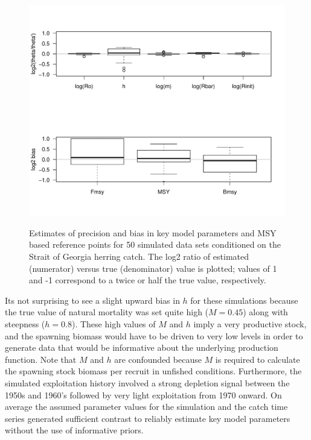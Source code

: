 \begin{figure}[!tbp]
	\includegraphics[width=\textwidth]{../Figs/SOGParameterBias.pdf}\\
	\caption{Estimates of precision and bias in key model parameters and MSY based reference points for 50 simulated data sets conditioned on the Strait of Georgia herring catch. The log2 ratio of estimated (numerator) versus true (denominator) value is plotted; values of 1 and -1 correspond to a twice or  half the true value, respectively.}\label{FigSogBias}
\end{figure}

Its not surprising to see a slight upward bias in $h$ for these simulations because the true value of natural mortality was set quite high ($M=0.45$) along with steepness ($h=0.8$). These high values of $M$ and $h$ imply a very productive stock, and the spawning biomass would have to be driven to very low levels in order to generate data that would be informative about the underlying production function.  Note that $M$ and $h$ are confounded because $M$ is required to calculate the spawning stock biomass per recruit in unfished conditions. Furthermore, the simulated exploitation history involved a strong depletion signal between the 1950s and 1960's followed by very light exploitation from 1970 onward.  On average the assumed parameter values for the simulation and the catch time series generated sufficient contrast to reliably estimate key model parameters without the use of informative priors.

